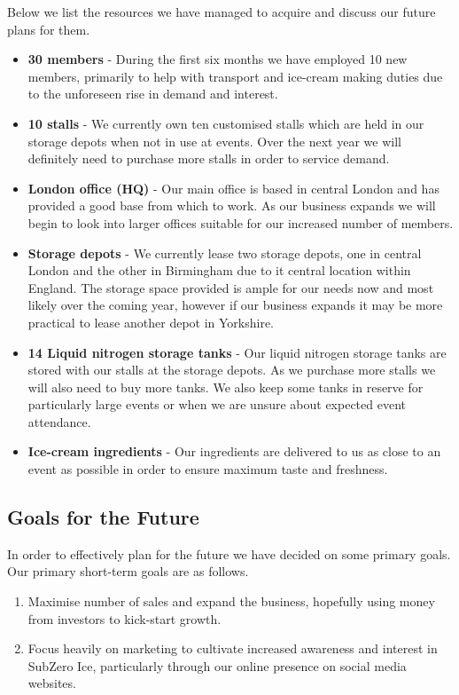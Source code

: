 \documentclass{article}
\begin{document}
  Below we list the resources we have managed to acquire and discuss our future plans for them.
  \begin{itemize}

  \item {\bf 30 members} - During the first six months we have employed 10 new members, primarily to help with transport and ice-cream making duties due to the unforeseen rise in demand and interest.

  \item {\bf 10 stalls} - We currently own ten customised stalls which are held in our storage depots when not in use at events. Over the next year we will definitely need to purchase more stalls in order to service demand.

  \item {\bf London office (HQ)} - Our main office is based in central London and has provided a good base from which to work. As our business expands we will begin to look into larger offices suitable for our increased number of members.

  \item {\bf Storage depots} - We currently lease two storage depots, one in central London and the other in Birmingham due to it central location within England. The storage space provided is ample for our needs now and most likely over the coming year, however if our business expands it may be more practical to lease another depot in Yorkshire.

  \item {\bf 14 Liquid nitrogen storage tanks} - Our liquid nitrogen storage tanks are stored with our stalls at the storage depots. As we purchase more stalls we will also need to buy more tanks. We also keep some tanks in reserve for particularly large events or when we are unsure about expected event attendance.

  \item {\bf Ice-cream ingredients} - Our ingredients are delivered to us as close to an event as possible in order to ensure maximum taste and freshness.

  \end{itemize}


  \subsection{Goals for the Future}

  In order to effectively plan for the future we have decided on some primary goals. Our primary short-term goals are as follows.
  \begin{enumerate}

    \item Maximise number of sales and expand the business, hopefully using money from investors to kick-start growth.

    \item Focus heavily on marketing to cultivate increased awareness and interest in SubZero Ice, particularly through our online presence on social media websites.
  \end{enumerate}
\end{document}
